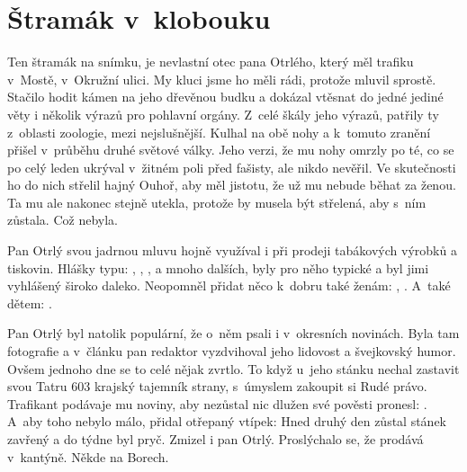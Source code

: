 
\chapter{Štramák v~klobouku}

Ten štramák na snímku, je nevlastní otec pana Otrlého, který měl trafiku
v~Mostě, v~Okružní ulici. My kluci jsme ho měli rádi, protože mluvil sprostě.
Stačilo hodit kámen na jeho dřevěnou budku a dokázal vtěsnat do jedné jediné
věty i několik výrazů pro pohlavní orgány. Z~celé škály jeho výrazů, patřily ty
z~oblasti zoologie, mezi nejslušnější. Kulhal na obě nohy a k~tomuto zranění
přišel v~průběhu druhé světové války. Jeho verzi, že mu nohy omrzly po té, co
se po celý leden ukrýval v~žitném poli před fašisty, ale nikdo nevěřil. Ve
skutečnosti ho do nich střelil hajný Ouhoř, aby měl jistotu, že už mu nebude
běhat za ženou. Ta mu ale nakonec stejně utekla, protože by musela být
střelená, aby s~ním zůstala. Což nebyla.

Pan Otrlý svou jadrnou mluvu hojně využíval i při prodeji tabákových výrobků a
tiskovin. Hlášky typu: ,
, , a mnoho dalších, byly pro něho typické a byl jimi
vyhlášený široko daleko. Neopomněl přidat něco k~dobru také ženám: , . A~také dětem: .

Pan Otrlý byl natolik populární, že o~něm psali i v~okresních novinách. Byla
tam fotografie a v~článku pan redaktor vyzdvihoval jeho lidovost a švejkovský
humor. Ovšem jednoho dne se to celé nějak zvrtlo. To když u~jeho stánku nechal
zastavit svou Tatru 603 krajský tajemník strany, s~úmyslem zakoupit si Rudé
právo. Trafikant podávaje mu noviny, aby nezůstal nic dlužen své pověsti
pronesl: . A~aby toho
nebylo málo, přidal otřepaný vtípek:  Hned druhý den zůstal stánek
zavřený a do týdne byl pryč. Zmizel i pan Otrlý. Proslýchalo se, že prodává
v~kantýně. Někde na Borech.

